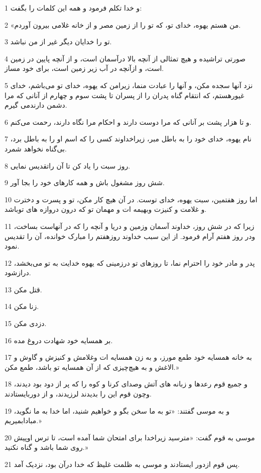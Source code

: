 \par 1 و خدا تکلم فرمود و همه این کلمات را بگفت:
\par 2 «من هستم یهوه، خدای تو، که تو را از زمین مصر و از خانه غلامی بیرون آوردم.
\par 3 تو را خدایان دیگر غیر از من نباشد.
\par 4 صورتی تراشیده و هیچ تمثالی از آنچه بالا درآسمان است، و از آنچه پایین در زمین است، و ازآنچه در آب زیر زمین است، برای خود مساز.
\par 5 نزد آنها سجده مکن، و آنها را عبادت منما، زیرامن که یهوه، خدای تو می‌باشم، خدای غیورهستم، که انتقام گناه پدران را از پسران تا پشت سوم و چهارم از آنانی که مرا دشمن دارندمی گیرم.
\par 6 و تا هزار پشت بر آنانی که مرا دوست دارند و احکام مرا نگاه دارند، رحمت می‌کنم.
\par 7 نام یهوه، خدای خود را به باطل مبر، زیراخداوند کسی را که اسم او را به باطل برد، بی‌گناه نخواهد شمرد.
\par 8 روز سبت را یاد کن تا آن راتقدیس نمایی.
\par 9 شش روز مشغول باش و همه کارهای خود را بجا آور.
\par 10 اما روز هفتمین، سبت یهوه، خدای توست. در آن هیچ کار مکن، تو و پسرت و دخترت و غلامت و کنیزت وبهیمه ات و مهمان تو که درون دروازه های توباشد.
\par 11 زیرا که در شش روز، خداوند آسمان وزمین و دریا و آنچه را که در آنهاست بساخت، ودر روز هفتم آرام فرمود. از این سبب خداوند روزهفتم را مبارک خوانده، آن را تقدیس نمود.
\par 12 پدر و مادر خود را احترام نما، تا روزهای تو درزمینی که یهوه خدایت به تو می‌بخشد، درازشود.
\par 13 قتل مکن.
\par 14 زنا مکن.
\par 15 دزدی مکن.
\par 16 بر همسایه خود شهادت دروغ مده.
\par 17 به خانه همسایه خود طمع مورز، و به زن همسایه ات وغلامش و کنیزش و گاوش و الاغش و به هیچ‌چیزی که از آن همسایه تو باشد، طمع مکن.»
\par 18 و جمیع قوم رعدها و زبانه های آتش وصدای کرنا و کوه را که پر از دود بود دیدند، وچون قوم این را بدیدند لرزیدند، و از دوربایستادند.
\par 19 و به موسی گفتند: «تو به ما سخن بگو و خواهیم شنید، اما خدا به ما نگوید، مبادابمیریم.»
\par 20 موسی به قوم گفت: «مترسید زیراخدا برای امتحان شما آمده است، تا ترس اوپیش روی شما باشد و گناه نکنید.»
\par 21 پس قوم ازدور ایستادند و موسی به ظلمت غلیظ که خدا درآن بود، نزدیک آمد.
